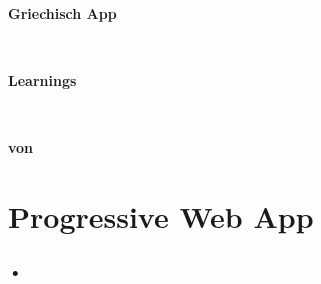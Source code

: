 \documentclass[oneside]{book}%
\def\autor{}
\begin{document}

\sloppy
\pagestyle{headings}


\begin{titlepage}
 \renewcommand{\baselinestretch}{1.4}\normalsize
  
  \vspace{5cm}
  \begin{center}
    
    \begin{Huge}\textbf{Griechisch App}\end{Huge}\\
    \vspace{0.8cm}
    \begin{huge}\textbf{Learnings}\end{huge}\\
    
    \vspace{0.6cm}
    
    \begin{Large}\textbf{von \autor\ \\}
    \end{Large}
  \end{center}
\end{titlepage}



\chapter{Progressive Web App}
\subsection{•}



\tableofcontents           %
\cleardoublepage
{}


\end{document}
